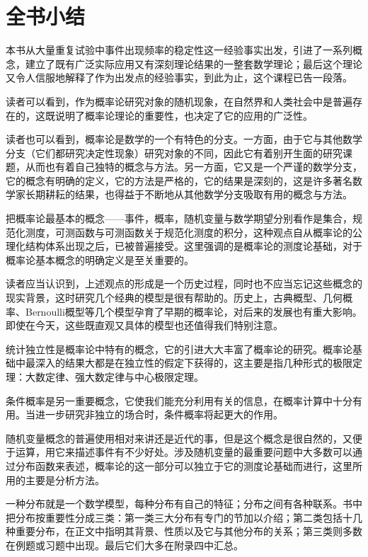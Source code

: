 \documentclass[../main.tex]{subfiles}
\begin{document}
\chapter*{全书小结}

本书从大量重复试验中事件出现频率的稳定性这一经验事实出发，引进了一系列概念，建立了既有广泛实际应用又有深刻理论结果的一整套数学理论；最后这个理论又令人信服地解释了作为出发点的经验事实，到此为止，这个课程已告一段落。

读者可以看到，作为概率论研究对象的随机现象，在自然界和人类社会中是普遍存在的，这既说明了概率论理论的重要性，也决定了它的应用的广泛性。

读者也可以看到，概率论是数学的一个有特色的分支。一方面，由于它与其他数学分支（它们都研究决定性现象）研究对象的不同，因此它有着别开生面的研究课题，从而也有着自己独特的概念与方法。另一方面，它又是一个严谨的数学分支，它的概念有明确的定义，它的方法是严格的，它的结果是深刻的，这是许多著名数学家长期耕耘的结果，也得益于不断地从其他数学分支吸取有用的概念与方法。

把概率论最基本的概念——事件，概率，随机变量与数学期望分别看作是集合，规范化测度，可测函数与可测函数关于规范化测度的积分，这种观点自从概率论的公理化结构体系出现之后，已被普遍接受。这里强调的是概率论的测度论基础，对于概率论基本概念的明确定义是至关重要的。

读者应当认识到，上述观点的形成是一个历史过程，同时也不应当忘记这些概念的现实背景，这时研究几个经典的模型是很有帮助的。历史上，古典概型、几何概率、Bernoulli概型等几个模型孕育了早期的概率论，对后来的发展也有重大影响。即使在今天，这些既直观又具体的模型也还值得我们特别注意。

统计独立性是概率论中特有的概念，它的引进大大丰富了概率论的研究。概率论基础中最深入的结果大都是在独立性的假定下获得的，这主要是指几种形式的极限定理：大数定律、强大数定律与中心极限定理。

条件概率是另一重要概念，它使我们能充分利用有关的信息，在概率计算中十分有用。当进一步研究非独立的场合时，条件概率将起更大的作用。

随机变量概念的普遍使用相对来讲还是近代的事，但是这个概念是很自然的，又便于运算，用它来描述事件有不少好处。涉及随机变量的最重要问题中大多数可以通过分布函数来表述，概率论的这一部分可以独立于它的测度论基础而进行，这里所用的主要是分析方法。

一种分布就是一个数学模型，每种分布有自己的特征；分布之间有各种联系。书中把分布按重要性分成三类：第一类三大分布有专门的节加以介绍；第二类包括十几种重要分布，在正文中指明其背景、性质以及它与其他分布的关系；第三类则多数在例题或习题中出现。最后它们大多在附录四中汇总。
\end{document}
